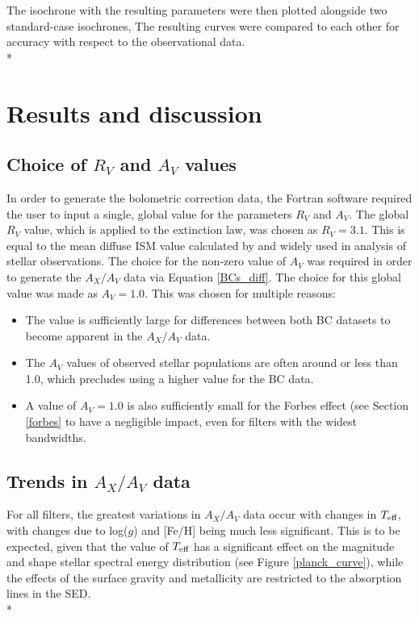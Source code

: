 \documentclass[12pt, a4paper]{report}
\begin{document}
The isochrone with the resulting parameters were then plotted alongside two standard-case isochrones, The resulting curves were compared to each other for accuracy with respect to the observational data.\\*


\chapter{Results and discussion}

\section{Choice of $R_{V}$ and $A_{V}$ values}
In order to generate the bolometric correction data, the Fortran software required the user to input a single, global value for the parameters $R_{V}$ and $A_{V}$. The global $R_{V}$ value, which is applied to the \cite{1989ApJ...345..245C} extinction law, was chosen as $R_{V} = 3.1$. This is equal to the mean diffuse ISM value calculated by \cite{1985ApJ...288..618R} and widely used in analysis of stellar observations. The choice for the non-zero value of $A_{V}$ was required in order to generate the $A_{X}/A_{V}$ data via Equation \ref{BCs_diff}. The choice for this global value was made as $A_{V} = 1.0$. This was chosen for multiple reasons:

\begin{itemize}
\item The value is sufficiently large for differences between both BC datasets to become apparent in the $A_{X}/A_{V}$ data.
\item The $A_{V}$ values of observed stellar populations are often around or less than 1.0, which precludes using a higher value for the BC data.
\item A value of $A_{V} = 1.0$ is also sufficiently small for the Forbes effect (see Section \ref{forbes} to have a negligible impact, even for filters with the widest bandwidths.
\end{itemize}

\section{Trends in $A_{X}/A_{V}$ data}
For all filters, the greatest variations in $A_{X}/A_{V}$ data occur with changes in $T_{\textnormal{eff}}$, with changes due to log($g$) and [Fe/H] being much less significant. This is to be expected, given that the value of $T_{\textnormal{eff}}$ has a significant effect on the magnitude and shape stellar spectral energy distribution (see Figure \ref{planck_curve}), while the effects of the surface gravity and metallicity are restricted to the absorption lines in the SED.\\*
\end{document}
